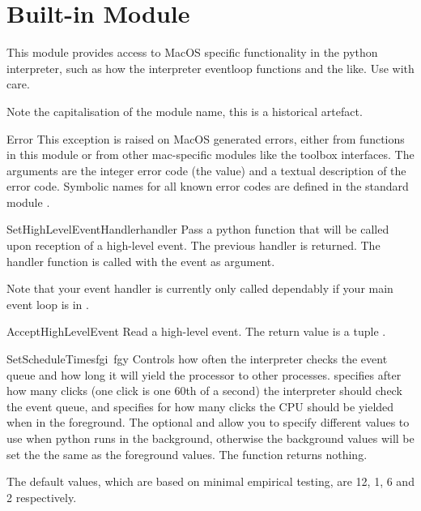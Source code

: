 \section{Built-in Module }

\renewcommand{\indexsubitem}{(in module MacOS)}

This module provides access to MacOS specific functionality in the
python interpreter, such as how the interpreter eventloop functions
and the like. Use with care.

Note the capitalisation of the module name, this is a historical
artefact.

\begin{excdesc}{Error}
This exception is raised on MacOS generated errors, either from
functions in this module or from other mac-specific modules like the
toolbox interfaces. The arguments are the integer error code (the
 value) and a textual description of the error code.
Symbolic names for all known error codes are defined in the standard
module .
\end{excdesc}

\begin{funcdesc}{SetHighLevelEventHandler}{handler}
Pass a python function that will be called upon reception of a
high-level event. The previous handler is returned. The handler
function is called with the event as argument.

Note that your event handler is currently only called dependably if
your main event loop is in .
\end{funcdesc}

\begin{funcdesc}{AcceptHighLevelEvent}{}
Read a high-level event. The return value is a tuple .
\end{funcdesc}

\begin{funcdesc}{SetScheduleTimes}{fgi\, fgy }
Controls how often the interpreter checks the event queue and how
long it will yield the processor to other processes. 
specifies after how many clicks (one click is one 60th of a second)
the interpreter should check the event queue, and  specifies
for how many clicks the CPU should be yielded when in the
foreground. The optional  and  allow you to specify
different values to use when python runs in the background, otherwise
the background values will be set the the same as the foreground
values. The function returns nothing.

The default values, which are based on minimal empirical testing, are 12, 1, 6
and 2 respectively.
\end{funcdesc}

